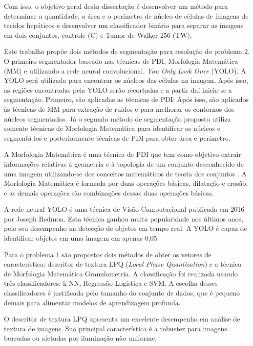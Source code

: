 Com isso, o objetivo geral desta dissertação é desenvolver um método para determinar a quantidade, a área e o perímetro de núcleo de células de imagens de tecidos hepáticos e desenvolver um classificador binário para separar as imagens em dois conjuntos, controle (C) e Tumor de Walker 256 (TW).

Este trabalho propõe dois métodos de segmentação para resolução do problema 2. O primeiro segmentador baseado nas técnicas de PDI, Morfologia Matemática (MM) e utilizando a rede neural convolucional, \textit{You Only Look Once} (YOLO). A YOLO será utilizada para encontrar os núcleos das células na imagem. Após isso, as regiões encontradas pela YOLO serão recortadas e a partir daí inicia-se a segmentação. Primeiro, são aplicadas as técnicas de PDI. Após isso, são aplicados às técnicas de MM para extração de ruídos e para melhorar os contornos dos núcleos segmentados. Já o segundo método de segmentação proposto utiliza somente técnicas de Morfologia Matemática para identificar os núcleos e segmentá-los e posteriormente técnicas de PDI para obter área e perímetro. 

A Morfologia Matemática é uma técnica de PDI que tem como objetivo extrair informações relativas à geometria e à topologia de um conjunto desconhecido de uma imagem utilizando-se dos conceitos matemáticos de teoria dos conjuntos \cite{pedrinischwartz}. A Morfologia Matemática é formada por duas operações básicas, dilatação e erosão, e as demais operações são combinações dessas duas operações básicas.

A rede neural YOLO é uma técnica de Visão Computacional publicada em 2016  por  Joseph Redmon. Esta técnica ganhou muita popularidade nos últimos anos, pelo seu desempenho na detecção de objetos em tempo real. A YOLO é capaz de identificar objetos em uma imagem em apenas 0,05.

Para o problema 1 são propostos dois métodos de obter os vetores de característica: descritor de textura LPQ (\textit{Local Phase Quantization}) e a técnica de Morfologia Matemática Granulometria. A classificação foi realizada usando três classificadores: k-NN, Regressão Logística e SVM. A escolha desses classificadores é justificada pelo tamanho do conjunto de dados, que é pequeno demais para alimentar modelos de aprendizagem profunda.

O descritor de textura LPQ apresenta um excelente desempenho em análise de textura de imagens. Sua principal característica é a robustez para imagens borradas ou afetadas por iluminação não uniforme. 

